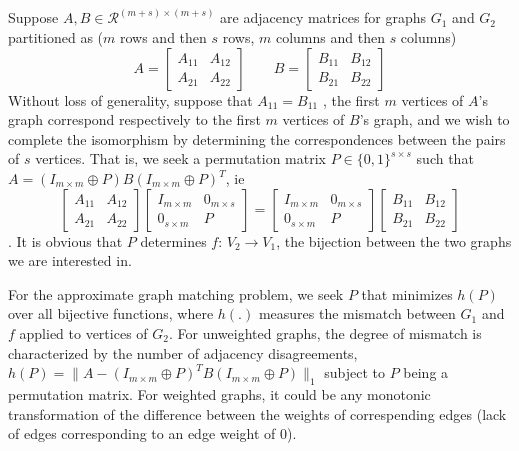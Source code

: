\documentclass[12pt,oneside,final]{thesis}\usepackage[]{graphicx}\usepackage[]{color}
\begin{document}
Suppose $A,B \in \mathcal{R}^{(m+s)\times (m+s)}$ are adjacency matrices for graphs $G_1$ and $G_2$
 partitioned as ($m$ rows and then $s$ rows, $m$ columns and then $s$ columns)
\[  A =\left [
\begin{array}{cc} A_{11} & A_{12} \\ A_{21} & A_{22} \end{array} \right ]
\ \ \ \ \ \ \ \ \ B =\left [
\begin{array}{cc} B_{11} & B_{12} \\ B_{21} & B_{22} \end{array} \right ]
\]
Without loss of generality, suppose that $A_{11}=B_{11}$ , \ie the first $m$ vertices
of $A$'s graph correspond respectively to the first $m$ vertices of $B$'s graph,
and we wish to complete the isomorphism by determining the correspondences between the pairs of $s$ vertices. 
That is, we seek a permutation matrix $P \in \{0,1\}^{s \times s}$ such that $A=(I_{m \times m}
\oplus P)B(I_{m \times m} \oplus P)^T$, ie
 \[
 \left [
\begin{array}{cc} A_{11} & A_{12} \\ A_{21} & A_{22} \end{array}
\right ]
\left [
\begin{array}{cc} I_{m \times m} & 0_{m \times s} \\ 0_{s \times m} & P \end{array}
\right ]
=
\left [
\begin{array}{cc} I_{m \times m} & 0_{m \times s} \\ 0_{s \times m} & P \end{array}
\right ]
\left [
\begin{array}{cc} B_{11} & B_{12} \\ B_{21} & B_{22} \end{array}
\right ] 
\].  It is obvious that $P$ determines $f$: $V_2 \rightarrow V_1$, the bijection  between the two graphs we are interested in.

For the approximate graph matching problem, we seek $P$ that minimizes $h(P)$ over all bijective functions, where $h(.)$ measures the mismatch between $G_1$ and $f$ applied to vertices of $G_2$.
For unweighted graphs, the degree of mismatch is characterized by the number of adjacency disagreements, \ie 
$h(P)=\|A- (I_{m \times m}\oplus P)^{T}B(I_{m \times m}\oplus P)\|_1$ subject to $P$ being a permutation matrix.
For weighted graphs, it could be any monotonic transformation of the difference between the weights of correspending edges (lack of edges corresponding to an edge weight of 0).
%
   
\end{document}
